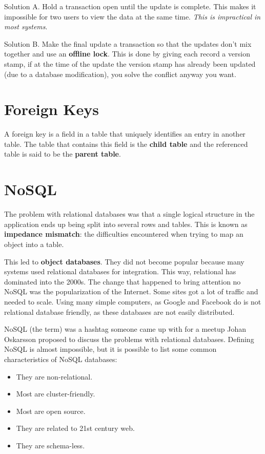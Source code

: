 \documentclass[oneside]{book}
\begin{document}
Solution A. Hold a transaction open until the update is complete. This makes it
impossible for two users to view the data at the same time. \textit{This is
impractical in most systems}.

Solution B. Make the final update a transaction so that the updates don't mix
together and use an \textbf{offline lock}. This is done by giving each record a
version stamp, if at the time of the update the version stamp has already been
updated (due to a database modification), you solve the conflict anyway you
want.

\section{Foreign Keys}
A foreign key is a field in a table that uniquely identifies an entry in another
table. The table that contains this field is the \textbf{child table} and the
referenced table is said to be the \textbf{parent table}.

\section{NoSQL}
The problem with relational databases was that a single logical structure in the
application ends up being split into several rows and tables. This is known as
\textbf{impedance mismatch}: the difficulties encountered when trying to map
an object into a table.

This led to \textbf{object databases}. They did not become popular because many
systems used relational databases for integration. This way, relational has
dominated into the 2000s. The change that happened to bring attention no NoSQL
was the popularization of the Internet. Some sites got a lot of traffic and
needed to scale. Using many simple computers, as Google and Facebook do is not
relational database friendly, as these databases are not easily distributed.

NoSQL (the term) was a hashtag someone came up with for a meetup Johan
Oskarsson proposed to discuss the problems with relational databases. Defining
NoSQL is almost impossible, but it is possible to list some common
characteristics of NoSQL databases:
\begin{itemize}
 \item They are non-relational.
 \item Most are cluster-friendly.
 \item Most are open source.
 \item They are related to 21st century web.
 \item They are schema-less.
\end{itemize}
\end{document}

